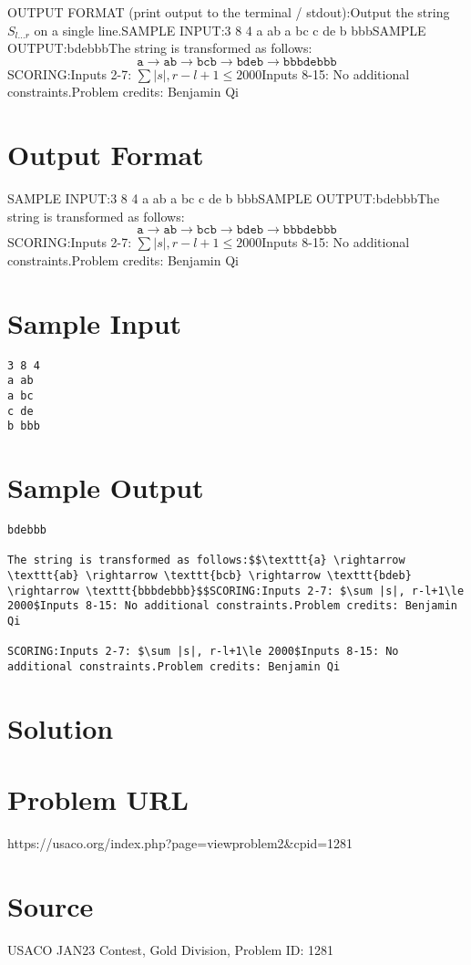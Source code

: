 \documentclass[12pt]{article}
\begin{document}
OUTPUT FORMAT (print output to the terminal / stdout):Output the string $S_{l\dots r}$ on a single line.SAMPLE INPUT:3 8 4
a ab
a bc
c de
b bbbSAMPLE OUTPUT:bdebbbThe string is transformed as follows:$$\texttt{a} \rightarrow \texttt{ab} \rightarrow \texttt{bcb} \rightarrow \texttt{bdeb} \rightarrow \texttt{bbbdebbb}$$SCORING:Inputs 2-7: $\sum |s|, r-l+1\le 2000$Inputs 8-15: No additional constraints.Problem credits: Benjamin Qi

\section*{Output Format}
SAMPLE INPUT:3 8 4
a ab
a bc
c de
b bbbSAMPLE OUTPUT:bdebbbThe string is transformed as follows:$$\texttt{a} \rightarrow \texttt{ab} \rightarrow \texttt{bcb} \rightarrow \texttt{bdeb} \rightarrow \texttt{bbbdebbb}$$SCORING:Inputs 2-7: $\sum |s|, r-l+1\le 2000$Inputs 8-15: No additional constraints.Problem credits: Benjamin Qi

\section*{Sample Input}
\begin{verbatim}
3 8 4
a ab
a bc
c de
b bbb
\end{verbatim}

\section*{Sample Output}
\begin{verbatim}
bdebbb

The string is transformed as follows:$$\texttt{a} \rightarrow \texttt{ab} \rightarrow \texttt{bcb} \rightarrow \texttt{bdeb} \rightarrow \texttt{bbbdebbb}$$SCORING:Inputs 2-7: $\sum |s|, r-l+1\le 2000$Inputs 8-15: No additional constraints.Problem credits: Benjamin Qi

SCORING:Inputs 2-7: $\sum |s|, r-l+1\le 2000$Inputs 8-15: No additional constraints.Problem credits: Benjamin Qi
\end{verbatim}

\section*{Solution}


\section*{Problem URL}
https://usaco.org/index.php?page=viewproblem2&cpid=1281

\section*{Source}
USACO JAN23 Contest, Gold Division, Problem ID: 1281
\end{document}

